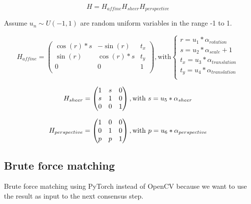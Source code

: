 \[
H = H_{affine} H_{sheer} H_{perspective}
\]

Assume $u_n \sim U(-1,1)$ are random uniform variables in the range -1 to 1.

\[
H_{affine} = 
\begin{pmatrix}
\cos(r)*s & -\sin(r) & t_x \\
\sin(r)& \cos(r)*s & t_y \\
0 & 0 & 1 \\
\end{pmatrix}
, \text{with}
\begin{cases}
r=u_1*\alpha_{rotation} \\
s=u_2*\alpha_{scale}+1 \\
t_x=u_3*\alpha_{translation} \\
t_y=u_4*\alpha_{translation} \\
\end{cases}
\]

\[
H_{sheer} = 
\begin{pmatrix}
1 & s & 0 \\
s & 1 & 0 \\
0 & 0 & 1 \\
\end{pmatrix}
, \text{with}
\ s=u_5*\alpha_{sheer} \\
\]

\[
H_{perspective} = 
\begin{pmatrix}
1 & 0 & 0 \\
0 & 1 & 0 \\
p & p & 1 \\
\end{pmatrix}
, \text{with}
\ p=u_6*\alpha_{perspective} \\
\]

\subsection{Brute force matching}

Brute force matching using PyTorch instead of OpenCV because we want to use the result as input to the next consensus step.